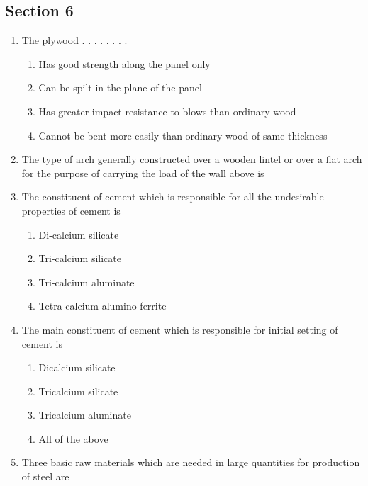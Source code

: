 \documentclass[11pt,a4paper]{article}
\begin{document}
\subsection*{Section 6}
\begin{enumerate}
\item{The plywood . . . . . . . .}
\begin{enumerate}[label=\Alph*.]
\item{Has good strength along the panel only}
\item{Can be spilt in the plane of the panel}
\item{Has greater impact resistance to blows than ordinary wood}
\item{Cannot be bent more easily than ordinary wood of same thickness}
\end{enumerate}
\item{The type of arch generally constructed over a wooden lintel or over a flat arch for the purpose of carrying the load of the wall above is}
\\
\item{The constituent of cement which is responsible for all the undesirable properties of cement is}
\begin{enumerate}[label=\Alph*.]
\item{Di-calcium silicate}
\item{Tri-calcium silicate}
\item{Tri-calcium aluminate}
\item{Tetra calcium alumino ferrite}
\end{enumerate}
\item{The main constituent of cement which is responsible for initial setting of cement is}
\begin{enumerate}[label=\Alph*.]
\item{Dicalcium silicate}
\item{Tricalcium silicate}
\item{Tricalcium aluminate}
\item{All of the above}
\end{enumerate}
\item{Three basic raw materials which are needed in large quantities for production of steel are}

\end{enumerate}
\end{document}
